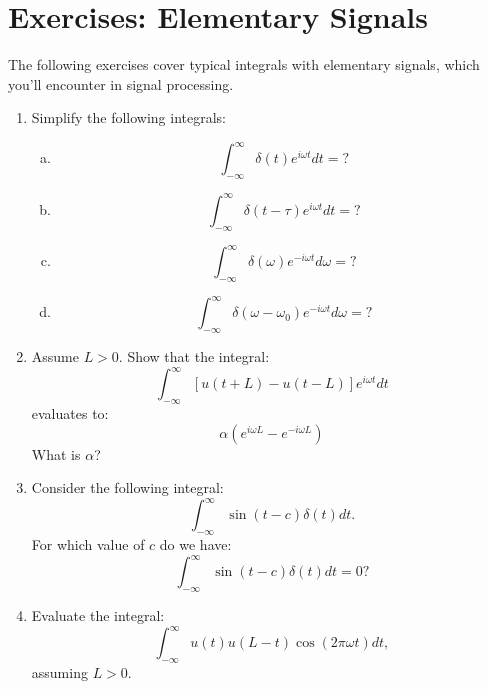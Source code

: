 \newpage
\section{Exercises: Elementary Signals}

The following exercises cover typical integrals with elementary signals, 
which you'll encounter in signal processing.

\begin{enumerate}
  \item Simplify the following integrals:
        \begin{enumerate}[a)]
          \item
                \begin{equation*}
                  \int_{-\infty}^{\infty} \delta(t)e^{i\omega t} dt = ?
                \end{equation*}
          \item

                \begin{equation*}
                  \int_{-\infty}^{\infty} \delta(t-\tau)e^{i\omega t} dt = ?
                \end{equation*}
          \item
                \begin{equation*}
                  \int_{-\infty}^{\infty} \delta(\omega)e^{-i\omega t} d\omega = ?
                \end{equation*}
          \item
                \begin{equation*}
                  \int_{-\infty}^{\infty} \delta(\omega-\omega_0)e^{-i\omega t} d\omega = ?
                \end{equation*}
        \end{enumerate}
  
  \item Assume $L>0$. Show that the integral:
        \begin{equation*}
          \int_{-\infty}^{\infty} [u(t+L)-u(t-L)]e^{i\omega t}dt
        \end{equation*}
        evaluates to:
        \begin{equation*}
          \alpha (e^{i\omega L} - e^{-i\omega L})
        \end{equation*}
        What is $\alpha$?

  \item Consider the following integral:
        \begin{equation*}
          \int_{-\infty}^{\infty}\sin(t-c)\delta(t)dt.
        \end{equation*}
        For which value of $c$ do we have:
        \begin{equation*}
          \int_{-\infty}^{\infty}\sin(t-c)\delta(t)dt=0?
        \end{equation*}

  \item Evaluate the integral:
        \begin{equation*}
          \int_{-\infty}^{\infty}u(t)u(L-t)\cos(2\pi\omega t)dt,
        \end{equation*}
        assuming $L>0$.


\end{enumerate}
